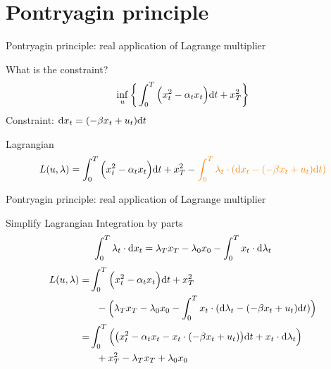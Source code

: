 \documentclass[color=usenames,dvipsnames]{beamer}
\newcommand{\dd}{\text{\normalfont d}}
\newcommand{\dt}{\text{\normalfont d}t}
\newcommand{\dx}{\text{\normalfont d}x}
\begin{document}
\section{Pontryagin principle}
\begin{frame}{Pontryagin principle: real application of Lagrange multiplier}
    \begin{block}
        {What is the constraint?}
    \begin{equation}
        \inf_{u}\bigg\{\int_0^T\Big(x_t^2 - \alpha_t x_t\Big) {{\dt}}+x_T^2\bigg\}
    \end{equation}
    Constraint: {\color{orange}${\dx}_t = (-\beta x_t + u_t ){{\dt}}$}
    \end{block}
    \begin{block}
        {Lagrangian}
        \[
        L(u,\lambda)= \int_0^T\Big(x_t^2 - \alpha_t x_t\Big) {{\dt}} +x_T^2 - {\color{orange}\int_0^T \lambda_t\cdot({\dx}_t-(-\beta x_t + u_t ){{\dt}})}
        \]
        
    \end{block}
\end{frame}
\begin{frame}{Pontryagin principle: real application of Lagrange multiplier}
    \begin{block}
        {Simplify Lagrangian}
        Integration by parts
    \[
    \int_0^T \lambda_t\cdot {\dx}_t = \lambda_Tx_T-\lambda_0x_0-\int_0^T x_t\cdot {\dd}\lambda_t
    \]
        \[
        \begin{split}
        L(u,\lambda)=& \int_0^T\Big(x_t^2 - \alpha_t x_t\Big) {{\dt}}+x_T^2 \\
        &~~- \Big(\lambda_Tx_T-\lambda_0x_0 -\int_0^T x_t\cdot({\dd}\lambda_t-(-\beta x_t + u_t ){{\dt}})\Big)  \\
        =& \int_0^T\Big(\big(x_t^2 - \alpha_t x_t -x_t\cdot(-\beta x_t + u_t)\big)\dt + x_t\cdot{\dd}\lambda_t  \Big) \\
        &~~+ x_T^2- \lambda_Tx_T +\lambda_0 x_0
        \end{split}\]
        
    \end{block}
\end{frame}
\end{document}
